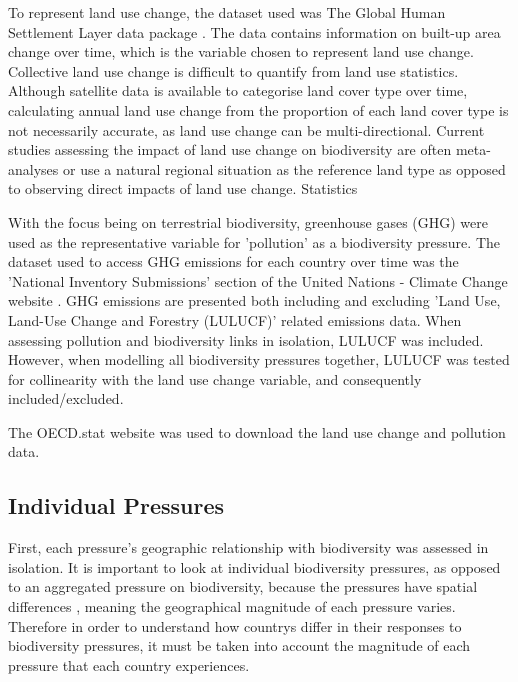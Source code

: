 \documentclass[11pt, a4paper, titlepage]{article}
\begin{document}
	To represent land use change, the dataset used was The Global Human Settlement Layer data package \cite{JRC117104}. The data contains information on built-up area change over time, which is the variable chosen to represent land use change. Collective land use change is difficult to quantify from land use statistics. Although satellite data is available to categorise land cover type over time, calculating annual land use change from the proportion of each land cover type is not necessarily accurate, as land use change can be multi-directional. Current studies assessing the impact of land use change on biodiversity are often meta-analyses or use a natural regional situation as the reference land type \cite{de2013land} as opposed to observing direct impacts of land use change. Statistics \newline
	
	With the focus being on terrestrial biodiversity, greenhouse gases (GHG) were used as the representative variable for 'pollution' as a biodiversity pressure. The dataset used to access GHG emissions for each country over time was the 'National Inventory Submissions' section of the United Nations - Climate Change website \cite{united nations}. GHG emissions are presented both including and excluding 'Land Use, Land-Use Change and Forestry (LULUCF)' related emissions data. When assessing pollution and biodiversity links in isolation, LULUCF was included. However, when modelling all biodiversity pressures together, LULUCF was tested for collinearity with the land use change variable, and consequently included/excluded. \newline
	
	The OECD.stat website was used to download the land use change and pollution data. \newline
	
	\subsection*{Individual Pressures}
	
	First, each pressure's geographic relationship with biodiversity was assessed in isolation. It is important to look at individual biodiversity pressures, as opposed to an aggregated pressure on biodiversity, because the pressures have spatial differences \cite{steffen2015planetary}, meaning the geographical magnitude of each pressure varies. Therefore in order to understand how countrys differ in their responses to biodiversity pressures, it must be taken into account the magnitude of each pressure that each country experiences. \newline
	
\end{document}
